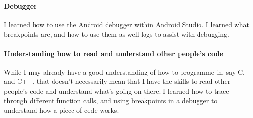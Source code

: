             \paragraph{Debugger}
            I learned how to use the Android debugger within Android Studio. I learned what breakpoints are, and how to use them as well logs to assist with debugging.
            \paragraph{Understanding how to read and understand other people's code}
            While I may already have a good understanding of how to programme in, say C, and C++, that doesn't necessarily mean that I have the skills to read other people's code and understand what's going on there. I learned how to trace through different function calls, and using breakpoints in a debugger to understand how a piece of code works.
        
